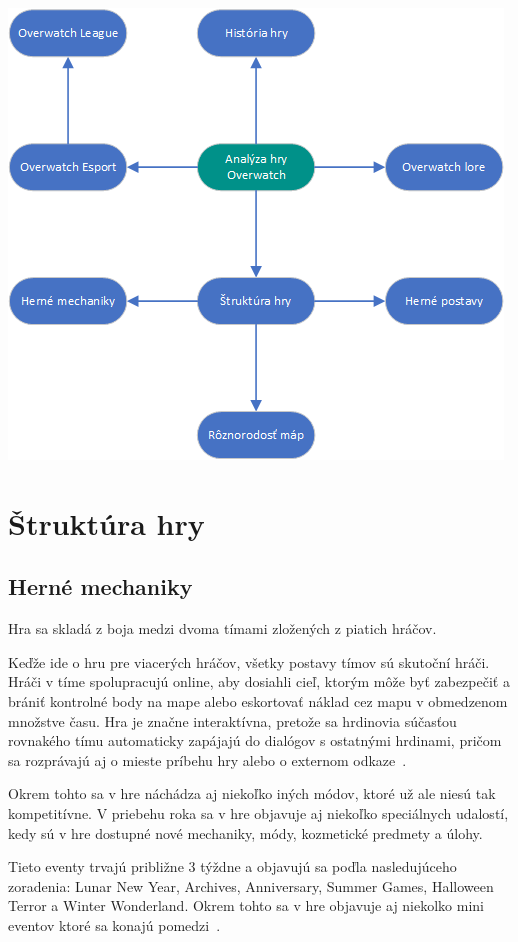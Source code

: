 \documentclass[10pt,oneside,slovak,a4paper]{article}
\begin{document}
\includegraphics[scale=1]{images/struktura_temy.png}


\section{Štruktúra hry} \label{Herné mechaniky}

\subsection{Herné mechaniky} \label{Herné mechaniky}


Hra sa skladá z boja medzi dvoma tímami zložených z piatich hráčov. 

Keďže ide o hru pre viacerých hráčov, všetky postavy tímov sú skutoční hráči. Hráči v tíme spolupracujú online, aby dosiahli cieľ, ktorým môže byť zabezpečiť a brániť kontrolné body na mape alebo eskortovať náklad cez mapu v obmedzenom množstve času. Hra je značne interaktívna, pretože sa hrdinovia súčasťou rovnakého tímu automaticky zapájajú do dialógov s ostatnými hrdinami, pričom sa rozprávajú aj o mieste príbehu hry alebo o externom odkaze~\cite{Overwatchbook}.

Okrem tohto sa v hre náchádza aj niekoľko iných módov, ktoré už ale niesú tak kompetitívne. V priebehu roka sa v hre objavuje aj niekoľko speciálnych udalostí,
 kedy sú v hre dostupné nové mechaniky, módy, kozmetické predmety a úlohy.

Tieto eventy trvajú približne 3 týždne a objavujú sa poďla nasledujúceho
zoradenia: Lunar New Year, Archives, Anniversary, Summer Games, Halloween Terror a Winter Wonderland. Okrem tohto sa v hre objavuje aj niekolko mini eventov ktoré sa konajú pomedzi~\cite{Overwatchbook}.
\end{document}
